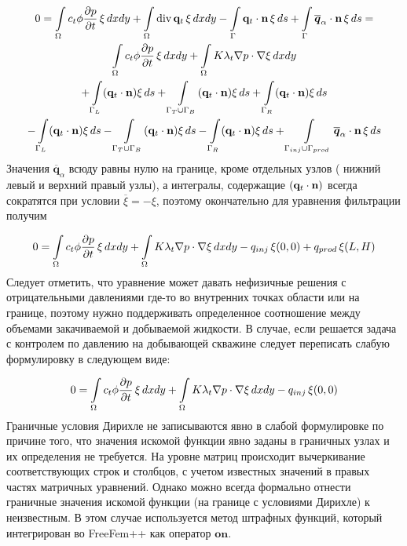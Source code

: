 \begin{multline}
	\displaystyle 0=\int\limits_\Omega c_t\phi \dfrac{\partial p}{\partial t}\, \xi \,dx dy 
	 + \int\limits_\Omega \operatorname{div}{\mathbf{q}_t}\, \xi \,dx dy
	 - \int\limits_{\Gamma} \mathbf{q}_t\cdot \mathbf{n} \, \xi \,ds 
	 + \int\limits_{\Gamma} \overline{\bm{q}}_{\alpha}\cdot \mathbf{n} \, \xi \,ds = \\ 
	 \int\limits_\Omega c_t\phi \dfrac{\partial p}{\partial t}\, \xi \,dx dy 
	 + \int\limits_\Omega K \lambda_t \nabla p \cdot \nabla\xi \,dx dy \\
	 +\int\limits_{\Gamma_L} (\mathbf{q}_t \cdot \mathbf{n}) \xi \, ds
	 +\int\limits_{\Gamma_T\cup \Gamma_B} (\mathbf{q}_t \cdot \mathbf{n}) \xi \, ds
	 +\int\limits_{\Gamma_R} (\mathbf{q}_t \cdot \mathbf{n}) \xi \, ds \\
	 -\int\limits_{\Gamma_L} (\mathbf{q}_t \cdot \mathbf{n}) \xi \, ds
	 -\int\limits_{\Gamma_T\cup \Gamma_B} (\mathbf{q}_t \cdot \mathbf{n}) \xi \, ds
	 -\int\limits_{\Gamma_R} (\mathbf{q}_t \cdot \mathbf{n}) \xi \, ds 
	 +\int\limits_{\Gamma_{inj}\cup \Gamma_{prod}} \overline{\bm{q}}_{\alpha}\cdot \mathbf{n} \, \xi \, ds\\ 
\end{multline}
Значения $\overline{\bm{q}}_{\alpha}$ всюду равны нулю на границе, кроме отдельных узлов (
нижний левый и верхний правый узлы), а интегралы, содержащие $(\mathbf{q}_t \cdot \mathbf{n})$ всегда сократятся
при условии $\overline{\xi} = -\xi$, поэтому окончательно для уравнения фильтрации получим

\begin{equation}\label{eq:PressureNeuman}
	0=\int\limits_\Omega c_t\phi \dfrac{\partial p}{\partial t}\, \xi \,dx dy 
	+ \int\limits_\Omega K \lambda_t \nabla p \cdot \nabla\xi \,dx dy - q_{inj}\, \xi(0,0)
	+ q_{prod}\, \xi(L,H)
\end{equation}
Следует отметить, что уравнение  может давать нефизичные решения с 
отрицательными давлениями где-то во внутренних точках области или на границе, поэтому нужно
поддерживать определенное соотношение между объемами закачиваемой и добываемой жидкости.
В случае, если решается задача с контролем по давлению на добывающей скважине следует переписать
слабую формулировку в следующем виде:

\begin{equation}\label{eq:PressureDirichlet}
	0=\int\limits_\Omega c_t\phi \dfrac{\partial p}{\partial t}\, \xi \,dx dy 
	+ \int\limits_\Omega K \lambda_t \nabla p \cdot \nabla\xi \,dx dy - q_{inj}\, \xi(0,0)
\end{equation}
Граничные условия Дирихле не записываются явно в слабой формулировке   по причине того, что
значения искомой функции явно заданы в граничных узлах и их определения не требуется. На уровне матриц
происходит вычеркивание соответствующих строк и столбцов, с учетом известных значений в правых
частях матричных уравнений. Однако можно всегда формально отнести граничные значения искомой функции (на границе 
с условиями Дирихле) к неизвестным. В этом случае используется метод штрафных функций, который
интегрирован во FreeFem++ как оператор $\mathbf{on}$. 

